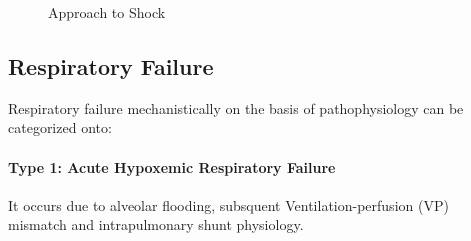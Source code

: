 \documentclass[
  letterpaper,
  DIV=11,
  numbers=noendperiod]{scrreprt}
\let\oldparagraph\paragraph
\renewcommand{\paragraph}[1]{\oldparagraph{#1}\mbox{}}
\begin{document}
\begin{figure}


\caption{\label{fig-shockalgorithm}Approach to Shock}

\end{figure}%

\subsection{Respiratory Failure}\label{respiratory-failure}

Respiratory failure mechanistically on the basis of pathophysiology can
be categorized onto:

\paragraph{Type 1: Acute Hypoxemic Respiratory
Failure}\label{type-1-acute-hypoxemic-respiratory-failure}

It occurs due to alveolar flooding, subsquent Ventilation-perfusion (VP)
mismatch and intrapulmonary shunt physiology.
\end{document}
